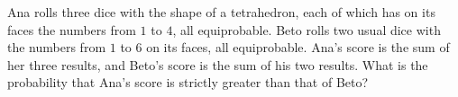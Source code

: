 Ana rolls three dice with the shape of a tetrahedron, each of which has on its faces the numbers from $1{}$ to $4{}$, all equiprobable. Beto rolls two usual dice with the numbers from $1{}$ to $6{}$ on its faces, all equiprobable. Ana's score is the sum of her three results, and Beto's score is the sum of his two results. What is the probability that Ana's score is strictly greater than that of Beto?
